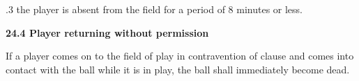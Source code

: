 \documentclass[12pt]{article}
\begin{document}
\vspace{\baselineskip}
{\fontsize{9pt}{10.8pt}.3 \tabto{0.49in} the player is absent from the field for a period of 8 minutes or less.\par}\par


\vspace{\baselineskip}

\vspace{\baselineskip}

\vspace{\baselineskip}

\vspace{\baselineskip}

\vspace{\baselineskip}

\vspace{\baselineskip}

\vspace{\baselineskip}
\begin{Center}
{\fontsize{8pt}{9.6pt}\par}
\end{Center}\par


\vspace{\baselineskip}
{\fontsize{11pt}{13.2pt}\selectfont \textbf{24.4 \tabto{0.47in} Player returning without permission}\par}\par


\vspace{\baselineskip}
\begin{adjustwidth}{0.0in}{0.1in}
{\fontsize{9pt}{10.8pt}\selectfont If a player comes on to the field of play in contravention of clause and comes into contact with the ball while it is in play, the ball shall immediately become dead.\par}\par

\end{adjustwidth}
\end{document}
